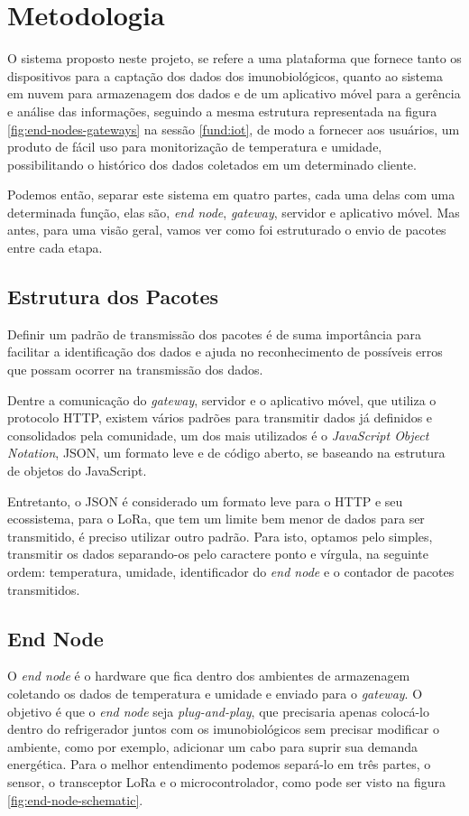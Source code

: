 \chapter{Metodologia}
\label{cap:metodologia}
O sistema proposto neste projeto, se refere a uma plataforma que fornece tanto os dispositivos para a captação dos dados dos imunobiológicos, quanto ao sistema em nuvem para armazenagem dos dados e de um aplicativo móvel para a gerência e análise das informações, seguindo a mesma estrutura representada na figura \ref{fig:end-nodes-gateways} na sessão \ref{fund:iot}, de modo a fornecer aos usuários, um produto  de fácil uso para monitorização de temperatura e umidade, possibilitando o histórico dos dados coletados em um determinado cliente.

Podemos então, separar este sistema em quatro partes, cada uma delas com uma determinada função, elas são, \textit{end node}, \textit{gateway}, servidor e aplicativo móvel. Mas antes, para uma visão geral, vamos ver como foi estruturado o envio de pacotes entre cada etapa.

\section{Estrutura dos Pacotes}
\label{metod:pacotes}
Definir um padrão de transmissão dos pacotes é de suma importância para facilitar a identificação dos dados e ajuda no reconhecimento de possíveis erros que possam ocorrer na transmissão dos dados.

Dentre a comunicação do \textit{gateway}, servidor e o aplicativo móvel, que utiliza o protocolo HTTP, existem vários padrões para transmitir dados já definidos e consolidados pela comunidade,  um dos mais utilizados é o \textit{JavaScript Object Notation}, JSON, um formato leve e de código aberto, se baseando na estrutura de objetos do JavaScript.

Entretanto, o JSON é considerado um formato leve para o HTTP e seu ecossistema, para o LoRa, que tem um limite bem menor de dados para ser transmitido, é preciso utilizar outro padrão. Para isto, optamos pelo simples, transmitir os dados separando-os pelo caractere ponto e vírgula, na seguinte ordem: temperatura, umidade, identificador do \textit{end node}  e o contador de pacotes transmitidos.

\section{End Node}
\label{metod:node}
O \textit{end node}  é o hardware que fica dentro dos ambientes de armazenagem coletando os dados de temperatura e umidade e enviado para o \textit{gateway}. O objetivo é que o \textit{end node}  seja \textit{plug-and-play}, que precisaria apenas colocá-lo dentro do refrigerador juntos com os imunobiológicos sem precisar modificar o ambiente, como por exemplo, adicionar um  cabo para suprir sua demanda energética. Para o melhor entendimento podemos separá-lo em três partes, o sensor, o transceptor LoRa e o microcontrolador, como pode ser visto na figura \ref{fig:end-node-schematic}.


